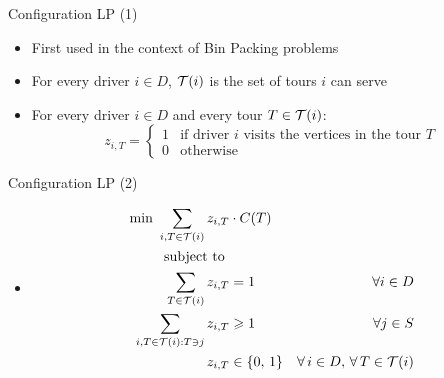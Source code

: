 \begin{frame}[t]{Configuration LP (1)}
    \begin{itemize}
        \item<1-> First used in the context of Bin Packing problems
        \item<2-> For every driver $i \in D$, $\mathcal{T}(i)$ is the set of tours $i$ can serve        
        \item<3-> For every driver $i \in D$ and every tour $T \in \mathcal{T}(i)$:
        \[
            z_{i, T} =
                \begin{cases}
                    1 & \text{if driver $i$ visits the vertices in the tour $T$} \\
                    0 & \text{otherwise}
                \end{cases}
        \]
    \end{itemize}
\end{frame}
\begin{frame}[t]{Configuration LP (2)}
    \label{CLP2}
    \begin{itemize}
        \item<1->[ ] \begin{align}
            \text {min } \label{cg_obj}	 \sum_{ i, 	T \in \mathcal{T}(i) } z_{i, T} & \cdot C(T) &    &  \\
            \text{subject to }             & & \nonumber  \\
            \label{const:cg1}       \sum_{ T \in \mathcal{T}(i) } z_{ i, T } & = 1  &   \forall i \in D \\
            \label{const:cg2}       \sum_{ i, T \in \mathcal{T}(i): T \ni j } z_{ i, T } & \geqslant 1   &   \forall j \in S \\
            \label{consT:cg3}       z_{ i, T } & \in \{0,\, 1\}    & \forall \, i \in D, \, \forall \, T \in \mathcal{T}(i) 
        \end{align}        
        \hyperlink{our_method_bp}{}
    \end{itemize}
\end{frame}

